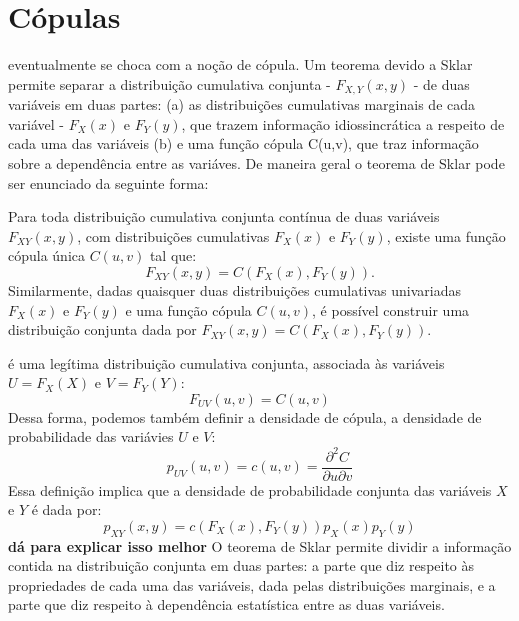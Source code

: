 \section{Cópulas}
 eventualmente se choca com a noção de cópula\cite{Nelsen1999}. Um teorema devido a Sklar\cite{Sklar1959} permite separar a distribuição cumulativa conjunta - $F_{X,Y}(x,y)$ - de duas variáveis em duas partes: (a) as distribuições cumulativas marginais de cada variável - $F_{X}(x)$ e $F_{Y}(y)$, que trazem informação idiossincrática a respeito de cada uma das variáveis (b) e uma função cópula C(u,v), que traz informação sobre a dependência entre as variáves. De maneira geral o teorema de Sklar pode ser enunciado da seguinte forma:
\begin{Teorema}
Para toda distribuição cumulativa conjunta contínua de duas variáveis $F_{XY}(x,y)$, com distribuições cumulativas $F_X(x)$ e $F_Y(y)$, existe uma função cópula única $C(u,v)$ tal que:
\begin{equation}
 F_{XY}(x,y) = C(F_{X}(x), F_{Y}(y)).
\end{equation}
Similarmente, dadas quaisquer duas distribuições cumulativas univariadas $F_X(x)$ e $F_Y(y)$ e uma função cópula $C(u,v)$, é possível construir uma distribuição conjunta dada por $F_{XY}(x,y) = C(F_X(x),F_Y(y))$.
\end{Teorema}

 é uma legítima distribuição cumulativa conjunta, associada às variáveis $U = F_{X}(X)$ e $V = F_{Y}(Y)$:
\begin{equation*}
 F_{UV}(u,v) = C(u,v)
\end{equation*}
Dessa forma, podemos também definir a densidade de cópula, a densidade de probabilidade das variávies $U$ e $V$:
\begin{equation*}
 p_{UV}(u,v) = c(u,v) = \frac{\partial^2 C}{\partial u \partial v}
\end{equation*}
Essa definição implica que a densidade de probabilidade conjunta das variáveis $X$ e $Y$ é dada por:
\begin{equation}
\label{eq:density}
 p_{XY}(x,y) = c(F_X(x), F_Y(y)) p_X(x) p_Y(y)
\end{equation}
\textbf{dá para explicar isso melhor}
O teorema de Sklar permite dividir a informação contida na distribuição conjunta em duas partes: a parte que diz respeito às propriedades de cada uma das variáveis, dada pelas distribuições marginais, e a parte que diz respeito à dependência estatística entre as duas variáveis.
